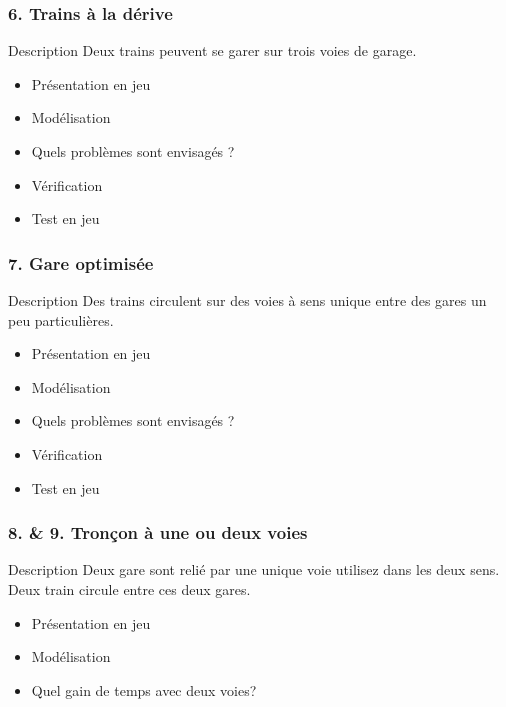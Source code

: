 \documentclass[french]{beamer}
\begin{document}
\begin{frame}
  \frametitle{6. Trains à la dérive}
  \begin{block}{Description}
  Deux trains peuvent se garer sur trois voies de garage.
  \end{block}

  \begin{itemize}
  \item Présentation en jeu
  \item Modélisation
  \item Quels problèmes sont envisagés ?
  \item Vérification
  \item Test en jeu
  \end{itemize}
\end{frame}

\begin{frame}
  \frametitle{7. Gare optimisée}
  \begin{block}{Description}
  Des trains circulent sur des voies à sens unique entre des gares
  un peu particulières.
  \end{block}

  \begin{itemize}
  \item Présentation en jeu
  \item Modélisation
  \item Quels problèmes sont envisagés ?
  \item Vérification
  \item Test en jeu
  \end{itemize}
\end{frame}

\begin{frame}
  \frametitle{8. \& 9.  Tronçon à une ou deux voies}
  \begin{block}{Description}
    Deux gare sont relié par une unique voie utilisez dans les deux
    sens. Deux train circule entre ces deux gares.
  \end{block}

  \begin{itemize}
  \item Présentation en jeu
  \item Modélisation
  \item Quel gain de temps avec deux voies?

  \end{itemize}
\end{frame}
\end{document}
